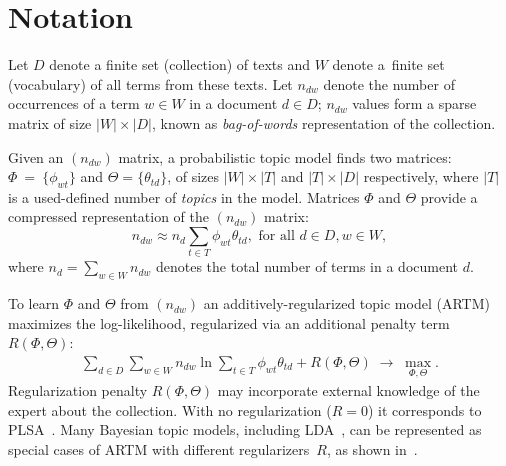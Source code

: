 \documentclass[russian,english]{llncs}
\begin{document}
\section{Notation}
\label{sec:Notation}

Let
$D$ denote a finite set (collection) of texts and
$W$ denote a~finite set (vocabulary) of all terms from these texts.
Let
$n_{dw}$ denote the number of occurrences of a term $w \in W$ in a document $d \in D$;
$n_{dw}$ values form a sparse matrix of size $|W| \times |D|$,
known as \emph{bag-of-words} representation of the collection.

Given an $(n_{dw})$ matrix, a probabilistic topic model finds two matrices:
$\Phi~=~\{\phi_{wt}\}$ and $\Theta = \{\theta_{td}\}$,
of sizes $|W| \times |T|$ and $|T| \times |D|$ respectively,
where $|T|$ is a used-defined number of \emph{topics} in the model.
Matrices $\Phi$ and $\Theta$
provide a compressed representation of the $(n_{dw})$ matrix:
\[
n_{dw} \approx n_d \sum_{t \in T} \phi_{wt} \theta_{td}, \text { for all } d \in D, w \in W,
\]
where $n_d = \sum_{w \in W} n_{dw}$ denotes the total number of terms in a document $d$.

To learn $\Phi$ and $\Theta$ from $(n_{dw})$ an additively-regularized topic model (ARTM) maximizes
the log-likelihood, regularized via an additional penalty term $R(\Phi, \Theta)$:
\begin{gather}
\label{eq:ARTM}
    \sum_{d\in D}\sum_{w\in W} n_{dw} \ln \sum_{t\in T} \phi_{wt} \theta_{td} + R(\Phi, \Theta)
    \;\to\; \max_{\Phi,\Theta}.
\end{gather}
Regularization penalty $R(\Phi, \Theta)$ may incorporate external knowledge
of the expert about the collection.
With no regularization (${R=0}$) it corresponds to PLSA~\cite{hofmann99plsi}.
Many Bayesian topic models, including LDA~\cite{blei03latent}, can be represented
as special cases of ARTM with different regularizers~$R$,
as shown in~\cite{voron14mlj,voron14aist}.
\end{document}
